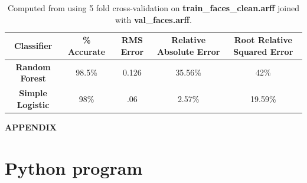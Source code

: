 \documentclass{report}
\begin{document}
\begin{table}[h]
  \centering
  \begin{tabular}{|c|c|c|c|c|}
    \hline
        {\bf Classifier} & {\bf \% Accurate} & {\bf RMS Error} &
        {\bf Relative Absolute Error} & {\bf Root Relative Squared
          Error}\\
        \hline
        {\bf Random Forest} & 98.5\% & 0.126 & 35.56\% & 42\%\\
        \hline
        {\bf Simple Logistic} & 98\% & .06 & 2.57\% & 19.59\%\\
        \hline
  \end{tabular}
  \caption{Computed from using 5 fold cross-validation on {\bf
      train\_faces\_clean.arff} joined with {\bf val\_faces.arff}.}
  \label{Table 3}
\end{table}
\newpage
\appendix
\begin{center}{\bf \LARGE{APPENDIX}}\end{center}
\section{Python program}

\end{document}
